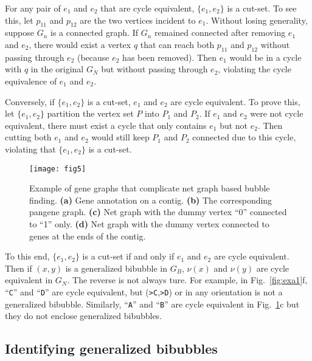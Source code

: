 \documentclass[webpdf,contemporary,large,namedate]{oup-authoring-template}%
\begin{document}
For any pair of $e_1$ and $e_2$ that are cycle equivalent, $\{e_1,e_2\}$ is a cut-set.
To see this, let $p_{11}$ and $p_{12}$ are the two vertices incident to $e_1$.
Without losing generality, suppose $G_n$ is a connected graph.
If $G_n$ remained connected after removing $e_1$ and $e_2$,
there would exist a vertex $q$ that can reach both $p_{11}$ and $p_{12}$ without passing through $e_2$ (because $e_2$ has been removed).
Then $e_1$ would be in a cycle with $q$ in the original $G_N$ but without passing through $e_2$,
violating the cycle equivalence of $e_1$ and $e_2$.

Conversely, if $\{e_1,e_2\}$ is a cut-set, $e_1$ and $e_2$ are cycle equivalent.
To prove this, let $\{e_1,e_2\}$ partition the vertex set $P$ into $P_1$ and $P_2$.
If $e_1$ and $e_2$ were not cycle equivalent, there must exist a cycle that only contains $e_1$ but not $e_2$.
Then cutting both $e_1$ and $e_2$ would still keep $P_1$ and $P_2$ connected due to this cycle,
violating that $\{e_1,e_2\}$ is a cut-set.

\begin{figure}[t!]
\centering
\texttt{[image: fig5]}
\caption{Example of gene graphs that complicate net graph based bubble finding.
{\bf (a)} Gene annotation on a contig.
{\bf (b)} The corresponding pangene graph.
{\bf (c)} Net graph with the dummy vertex ``0'' connected to ``1'' only.
{\bf (d)} Net graph with the dummy vertex connected to genes at the ends of the contig.
}\label{fig:complex}
\end{figure}

To this end, $\{e_1,e_2\}$ is a cut-set if and only if $e_1$ and $e_2$ are cycle equivalent.
Then if $(x,y)$ is a generalized bibubble in $G_B$,
$\nu(x)$ and $\nu(y)$ are cycle equivalent in $G_N$.
The reverse is not always ture.
For example, in Fig.~\ref{fig:exa1}f, ``{\tt C}'' and ``{\tt D}'' are cycle equivalent,
but ({\tt >C},{\tt >D}) or in any orientation is not a generalized bibubble.
Similarly, ``{\tt A}'' and ``{\tt B}'' are cycle equivalent in Fig.~\ref{fig:complex}c but they do not enclose generalized bibubbles.


\subsection{Identifying generalized bibubbles}
\end{document}
